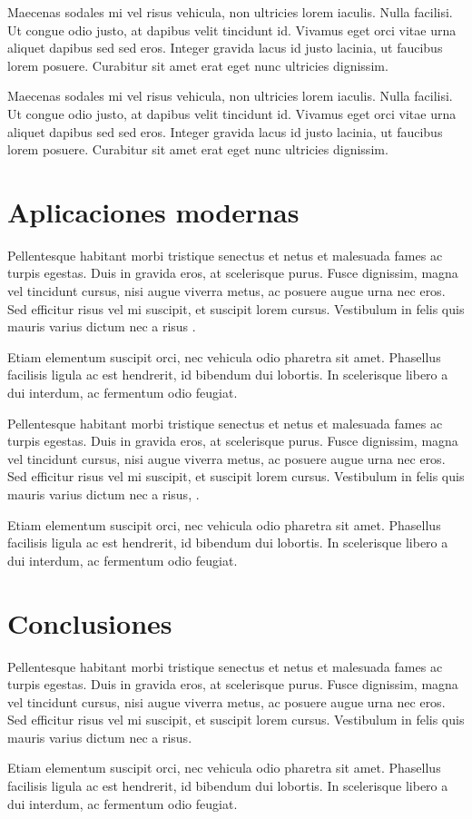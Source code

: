 Maecenas sodales mi vel risus vehicula, non ultricies lorem iaculis. Nulla facilisi. Ut congue odio justo, at dapibus velit tincidunt id. Vivamus eget orci vitae urna aliquet dapibus sed sed eros. Integer gravida lacus id justo lacinia, ut faucibus lorem posuere. Curabitur sit amet erat eget nunc ultricies dignissim.

Maecenas sodales mi vel risus vehicula, non ultricies lorem iaculis. Nulla facilisi. Ut congue odio justo, at dapibus velit tincidunt id. Vivamus eget orci vitae urna aliquet dapibus sed sed eros. Integer gravida lacus id justo lacinia, ut faucibus lorem posuere. Curabitur sit amet erat eget nunc ultricies dignissim.

\section{Aplicaciones modernas}

Pellentesque habitant morbi tristique senectus et netus et malesuada fames ac turpis egestas. Duis in gravida eros, at scelerisque purus. Fusce dignissim, magna vel tincidunt cursus, nisi augue viverra metus, ac posuere augue urna nec eros. Sed efficitur risus vel mi suscipit, et suscipit lorem cursus. Vestibulum in felis quis mauris varius dictum nec a risus \parencite[87-88]{@6282-DIAMAND1984}.

Etiam elementum suscipit orci, nec vehicula odio pharetra sit amet. Phasellus facilisis ligula ac est hendrerit, id bibendum dui lobortis. In scelerisque libero a dui interdum, ac fermentum odio feugiat.

Pellentesque habitant morbi tristique senectus et netus et malesuada fames ac turpis egestas. Duis in gravida eros, at scelerisque purus. Fusce dignissim, magna vel tincidunt cursus, nisi augue viverra metus, ac posuere augue urna nec eros. Sed efficitur risus vel mi suscipit, et suscipit lorem cursus. Vestibulum in felis quis mauris varius dictum nec a risus, \cite[véase para mas detalles][]{@6282-DIAMAND1984}.

Etiam elementum suscipit orci, nec vehicula odio pharetra sit amet. Phasellus facilisis ligula ac est hendrerit, id bibendum dui lobortis. In scelerisque libero a dui interdum, ac fermentum odio feugiat.

\section{Conclusiones}

Pellentesque habitant morbi tristique senectus et netus et malesuada fames ac turpis egestas. Duis in gravida eros, at scelerisque purus. Fusce dignissim, magna vel tincidunt cursus, nisi augue viverra metus, ac posuere augue urna nec eros. Sed efficitur risus vel mi suscipit, et suscipit lorem cursus. Vestibulum in felis quis mauris varius dictum nec a risus.

Etiam elementum suscipit orci, nec vehicula odio pharetra sit amet. Phasellus facilisis ligula ac est hendrerit, id bibendum dui lobortis. In scelerisque libero a dui interdum, ac fermentum odio feugiat.

\ifPDF
{}
\fi
